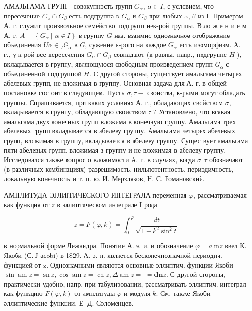 \documentclass[10pt]{article}
\begin{document}
АМАЈЬГАМА ГРУІІІ - совокупность групп $G_{\alpha}$, $\alpha \in I$, с условием, что пересечение $G_{\alpha} \cap G_{\beta}$ есть подгруппа в $G_{\alpha}$ и $G_{\beta}$ при любых $\alpha, \beta$ из I. Примером А. г. служит произвольное семейство подгрупп нек-рой группы. В ло ж е н и е м А. г. $A=\left\{G_{\alpha} \mid \alpha \in I\right\}$ в группу $G$ наз. взаимно однозначное отображение объединения $U \alpha \in{ }_{I} G_{\alpha}$ в $G$, сужение к-рого на каждое $G_{\alpha}$ есть изоморфизм. А. г., у к-рой все пересечения $G_{\alpha} \cap G_{\beta}$ совпадают (и равны, напр., подгруппе $H$ ), вкладывается в группу, являющуюся свободным произведением групп $G_{\alpha}$ с объединенной подгруппой $H$. С другой стороны, существует амальгама четырех абелевых групп, не вложимая в группу. Основная задача для А. г. в общей постановке состоит в следующем. Пусть $\sigma, \tau-$ свойства, к-рыми могут обладать группы. Спрашивается, при каких условиях А. г., обладающих свойством $\sigma$, вкладывается в грунпу, обладающую свойством $\tau$ ? Установлено, что всякая амальгама двух конечных групп вложима в конечную группу. Амальгама трех абелевых групп вкладывается в абелеву группу. Амальгама четырех абелевых групп, вложимая в группу, вкладывается в абелеву группу. Существует амальгама пяти абелевых групп, вложимая в группу и не вложимая в абелеву группу. Исследовался также вопрос о вложимости А. г. в случаях, когда $\sigma, \tau$ обозначают (в различных комбинациях) разрешимость, нильпотентность, периодичность, локальную конечность и т. п. ю. И. Мерзляков, Н. С. Романовский.



АМПЛИТУДА ӘЈЛИІТИЧЕСКОГО ИНТЕГРАЛА переменная $\varphi$, рассматриваемая как функция от $z$ в эллиптическом интеграле I рода



\[

z=F(\varphi, k)=\int_{0}^{\varphi} \frac{d t}{\sqrt{1-k^{2} \sin ^{2} t}}

\]



в нормальной форме Лежандра. Понятие А. э. и. и обозначение $\varphi=a \mathrm{~m} z$ ввел К. Якоби (С. Ј асobi) в 1829. А. э. и. является бесконечнозначной периодич. функцией от z. Однозначными являются основные эллиптич. функции Якоби $\sin \operatorname{am} z=\operatorname{sn} z, \cos \operatorname{am} z=\operatorname{cn} z, \Delta \operatorname{am} z=$ $=\mathbf{d n} z$. С другой стороны, практически удобно, напр. при табулировании, рассматривать эллиптич. интеграл как функцию $F(\varphi, k)$ от амплитуды $\varphi$ и модуля $k$. См. также Якоби әллиптические функции. Е. Д. Соломенцев.
\end{document}

